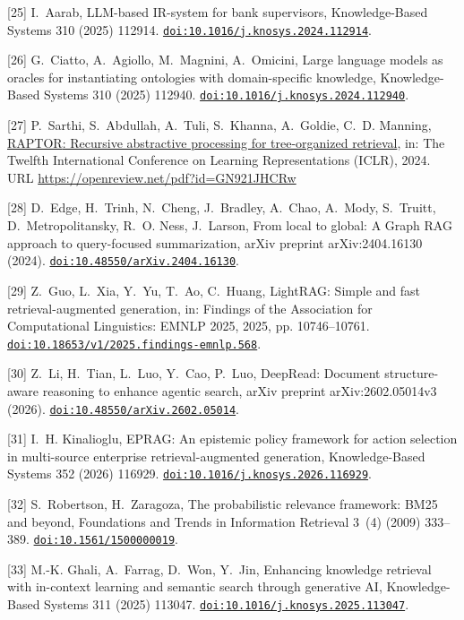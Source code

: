 [25] I.~Aarab, {LLM-based IR-system for bank supervisors}, Knowledge-Based Systems 310 (2025) 112914. \href {https://doi.org/10.1016/j.knosys.2024.112914} {\texttt{doi:10.1016/j.knosys.2024.112914}}.

[26] G.~Ciatto, A.~Agiollo, M.~Magnini, A.~Omicini, {Large language models as oracles for instantiating ontologies with domain-specific knowledge}, Knowledge-Based Systems 310 (2025) 112940. \href {https://doi.org/10.1016/j.knosys.2024.112940} {\texttt{doi:10.1016/j.knosys.2024.112940}}.

[27] P.~Sarthi, S.~Abdullah, A.~Tuli, S.~Khanna, A.~Goldie, C.~D. Manning, \href{https://openreview.net/pdf?id=GN921JHCRw}{{RAPTOR}: Recursive abstractive processing for tree-organized retrieval}, in: The Twelfth International Conference on Learning Representations ({ICLR}), 2024. URL \url{https://openreview.net/pdf?id=GN921JHCRw}

[28] D.~Edge, H.~Trinh, N.~Cheng, J.~Bradley, A.~Chao, A.~Mody, S.~Truitt, D.~Metropolitansky, R.~O. Ness, J.~Larson, From local to global: A {Graph RAG} approach to query-focused summarization, arXiv preprint arXiv:2404.16130 (2024). \href {https://doi.org/10.48550/arXiv.2404.16130} {\texttt{doi:10.48550/arXiv.2404.16130}}.

[29] Z.~Guo, L.~Xia, Y.~Yu, T.~Ao, C.~Huang, {LightRAG}: Simple and fast retrieval-augmented generation, in: Findings of the Association for Computational Linguistics: EMNLP 2025, 2025, pp. 10746--10761. \href {https://doi.org/10.18653/v1/2025.findings-emnlp.568} {\texttt{doi:10.18653/v1/2025.findings-emnlp.568}}.

[30] Z.~Li, H.~Tian, L.~Luo, Y.~Cao, P.~Luo, {DeepRead}: Document structure-aware reasoning to enhance agentic search, arXiv preprint arXiv:2602.05014v3 (2026). \href {https://doi.org/10.48550/arXiv.2602.05014} {\texttt{doi:10.48550/arXiv.2602.05014}}.

[31] I.~H. Kinalioglu, {EPRAG}: An epistemic policy framework for action selection in multi-source enterprise retrieval-augmented generation, Knowledge-Based Systems 352 (2026) 116929. \href {https://doi.org/10.1016/j.knosys.2026.116929} {\texttt{doi:10.1016/j.knosys.2026.116929}}.

[32] S.~Robertson, H.~Zaragoza, The probabilistic relevance framework: {BM25} and beyond, Foundations and Trends in Information Retrieval 3~(4) (2009) 333--389. \href {https://doi.org/10.1561/1500000019} {\texttt{doi:10.1561/1500000019}}.

[33] M.-K. Ghali, A.~Farrag, D.~Won, Y.~Jin, Enhancing knowledge retrieval with in-context learning and semantic search through generative {AI}, Knowledge-Based Systems 311 (2025) 113047. \href {https://doi.org/10.1016/j.knosys.2025.113047} {\texttt{doi:10.1016/j.knosys.2025.113047}}.

